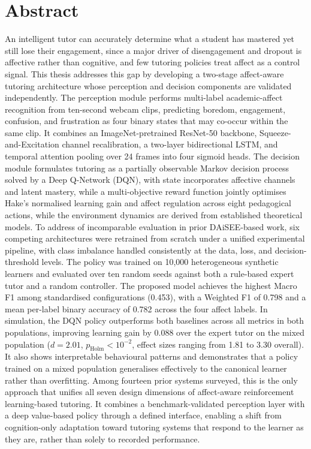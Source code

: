 \chapter*{Abstract}
\label{chap:abstract}
An intelligent tutor can accurately determine what a student has mastered yet still lose their engagement, since a major driver of disengagement and dropout is affective rather than cognitive, and few tutoring policies treat affect as a control signal. This thesis addresses this gap by developing a two-stage affect-aware tutoring architecture whose perception and decision components are validated independently. The perception module performs multi-label academic-affect recognition from ten-second webcam clips, predicting boredom, engagement, confusion, and frustration as four binary states that may co-occur within the same clip. It combines an ImageNet-pretrained ResNet-50 backbone, Squeeze-and-Excitation channel recalibration, a two-layer bidirectional LSTM, and temporal attention pooling over 24 frames into four sigmoid heads. The decision module formulates tutoring as a partially observable Markov decision process solved by a Deep Q-Network (DQN), with state incorporates affective channels and latent mastery, while a multi-objective reward function jointly optimises Hake’s normalised learning gain and affect regulation across eight pedagogical actions, while the environment dynamics are derived from established theoretical models. To address of incomparable evaluation in prior DAiSEE-based work, six competing architectures were retrained from scratch under a unified experimental pipeline, with class imbalance handled consistently at the data, loss, and decision-threshold levels. The policy was trained on 10,000 heterogeneous synthetic learners and evaluated over ten random seeds against both a rule-based expert tutor and a random controller. The proposed model achieves the highest Macro F1 among standardised configurations (0.453), with a Weighted F1 of 0.798 and a mean per-label binary accuracy of 0.782 across the four affect labels. In simulation, the DQN policy outperforms both baselines across all metrics in both populations, improving learning gain by 0.088 over the expert tutor on the mixed population ($d = 2.01$, $p_{\mathrm{Holm}} < 10^{-2}$, effect sizes ranging from 1.81 to 3.30 overall). It also shows interpretable behavioural patterns and demonstrates that a policy trained on a mixed population generalises effectively to the canonical learner rather than overfitting. Among fourteen prior systems surveyed, this is the only approach that unifies all seven design dimensions of affect-aware reinforcement learning-based tutoring. It combines a benchmark-validated perception layer with a deep value-based policy through a defined interface, enabling a shift from cognition-only adaptation toward tutoring systems that respond to the learner as they are, rather than solely to recorded performance.